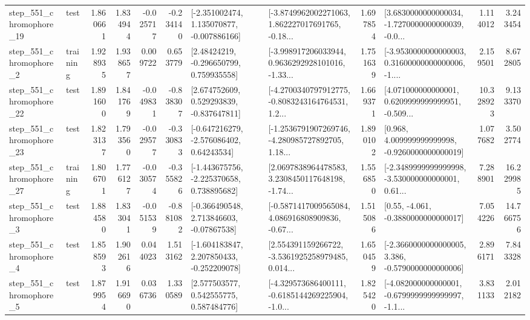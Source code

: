 \begin{tabular}{llrrrrllrlrr}
  step\_551\_chromophore\_19 &      test &      1.860661 &    1.834944 &     -0.025717 & -0.234140 &   [-2.351002474, 1.135070877, -0.007886166] &  [-3.8749962002271063, 1.862227017691765, -0.18... &       1.697854 &  [3.6830000000000034, -1.7270000000000039, -0.0... &            1.114012 &          3.243454 \\
   step\_551\_chromophore\_2 &  training &      1.928935 &    1.938657 &      0.009722 &  0.653779 &     [2.48424219, -0.296650799, 0.759935558] &  [-3.998917206033944, 0.9636292928101016, -1.33... &       1.751639 &  [-3.9530000000000003, 0.31600000000000006, -1.... &            2.159501 &          8.672805 \\
  step\_551\_chromophore\_22 &      test &      1.891600 &    1.841769 &     -0.049831 & -0.838307 &    [2.674752609, 0.529293839, -0.837647811] &  [-4.2700340797912775, -0.8083243164764531, 1.2... &       1.669371 &  [4.071000000000001, 0.6209999999999951, -0.509... &           10.328923 &          9.133370 \\
  step\_551\_chromophore\_23 &      test &      1.823137 &    1.793560 &     -0.029577 & -0.330833 &    [-0.647216279, -2.576086402, 0.64243534] &  [-1.2536791907269746, -4.280985727892705, 1.18... &       1.890102 &    [0.968, 4.009999999999998, -0.9260000000000019] &            1.077682 &          3.502774 \\
  step\_551\_chromophore\_27 &  training &      1.806701 &    1.776127 &     -0.030574 & -0.355826 &   [-1.443675756, -2.225370658, 0.738895682] &  [2.0697838964478583, 3.2308450117648198, -1.74... &       1.556850 &  [-2.3489999999999998, -3.530000000000001, 0.61... &            7.288901 &         16.229985 \\
   step\_551\_chromophore\_3 &      test &      1.884580 &    1.833041 &     -0.051539 & -0.881082 &    [-0.366490548, 2.713846603, -0.07867538] &  [-0.5871417009565084, 4.086916808909836, -0.67... &       1.515086 &                [0.55, -4.061, -0.3880000000000017] &            7.054226 &         14.766756 \\
   step\_551\_chromophore\_4 &      test &      1.858593 &    1.902616 &      0.044023 &  1.513162 &   [-1.604183847, 2.207850433, -0.252209078] &  [2.554391159266722, -3.5361925258979485, 0.014... &       1.650459 &  [-2.3660000000000005, 3.386, -0.5790000000000006] &            2.896171 &          7.843328 \\
   step\_551\_chromophore\_5 &      test &      1.879954 &    1.916690 &      0.036736 &  1.330589 &     [2.577503577, 0.542555775, 0.587484776] &  [-4.329573686400111, -0.6185144269225904, -1.0... &       1.825420 &  [-4.082000000000001, -0.6799999999999997, -1.1... &            3.831133 &          2.012182 \\

\end{tabular}
